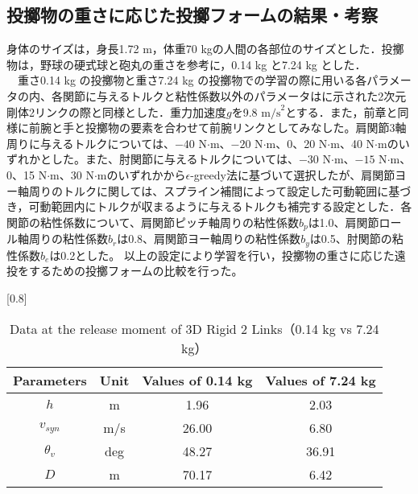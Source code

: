 \begin{small}
\subsection{投擲物の重さに応じた投擲フォームの結果・考察}
身体のサイズは，身長1.72 m，体重70 kgの人間の各部位のサイズとした．投擲物は，野球の硬式球と砲丸の重さを参考に，0.14 kg と7.24 kg とした．\\
　重さ0.14 kg の投擲物と重さ7.24 kg の投擲物での学習の際に用いる各パラメータの内、各関節に与えるトルクと粘性係数以外のパラメータはに示された2次元剛体2リンクの際と同様とした．重力加速度$g$を9.8 $\mathrm{m/s}^{2}$とする．また，前章と同様に前腕と手と投擲物の要素を合わせて前腕リンクとしてみなした。肩関節3軸周りに与えるトルクについては、$-40$ N$\cdot$m、$-20$ N$\cdot$m、0、20 N$\cdot$m、40 N$\cdot$mのいずれかとした。また、肘関節に与えるトルクについては、$-30$ N$\cdot$m、$-15$ N$\cdot$m、0、15 N$\cdot$m、30 N$\cdot$mのいずれかから$\epsilon$-greedy法に基づいて選択したが、肩関節ヨー軸周りのトルクに関しては、スプライン補間によって設定した可動範囲に基づき，可動範囲内にトルクが収まるように与えるトルクも補完する設定とした．各関節の粘性係数について、肩関節ピッチ軸周りの粘性係数$b_{p}$は1.0、肩関節ロール軸周りの粘性係数$b_{r}$は0.8、肩関節ヨー軸周りの粘性係数$b_{y}$は0.5、肘関節の粘性係数$b_{e}$は0.2とした。
以上の設定により学習を行い，投擲物の重さに応じた遠投をするための投擲フォームの比較を行った。\\
\begin{table}[t]
  \begin{center}
    \caption{Data at the release moment of 3D Rigid 2 Links（0.14 kg vs 7.24 kg）}
    \scalebox{0.8}[0.8]{
    \begin{tabular}{c|c|c|c}
      \hline
      Parameters & Unit & Values of 0.14 kg & Values of 7.24 kg \\
      \hline
      $h$ & m & 1.96 & 2.03 \\
      $v_{syn}$ & m/s & 26.00 & 6.80 \\
      $\theta_{v}$ & deg & 48.27 & 36.91 \\
      $D$ & m & 70.17 & 6.42 \\
      \hline
    \end{tabular}
    }
  \end{center}
\end{table}

\end{small}
